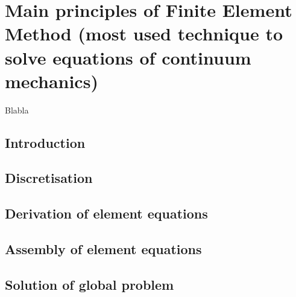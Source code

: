 \chapter{Main principles of Finite Element Method (most used technique to solve equations of continuum mechanics)}
\label{chap3}
\begin{shortAbstract}
Blabla
\end{shortAbstract}


\section{Introduction}

\section{Discretisation}

\section{Derivation of element equations}

\section{Assembly of element equations}

\section{Solution of global problem}
		



